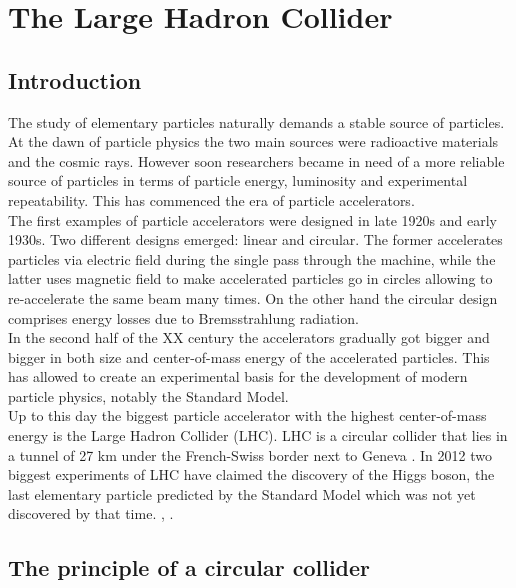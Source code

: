 \chapter{The Large Hadron Collider}
    
   
        
    \section{Introduction}
    
        The study of elementary particles naturally demands a stable source of particles. At the dawn of particle physics the two main sources were radioactive materials and the cosmic rays. However soon researchers became in need of a more reliable source of particles in terms of particle energy, luminosity and experimental repeatability. This has commenced the era of particle accelerators.\\
        The first examples of particle accelerators were designed in late 1920s and early 1930s. Two different designs emerged: linear and circular. The former accelerates particles via electric field during the single pass through the machine, while the latter uses magnetic field to make accelerated particles go in circles allowing to re-accelerate the same beam many times. On the other hand the circular design comprises energy losses due to Bremsstrahlung radiation.\\
        In the second half of the XX century the accelerators gradually got bigger and bigger in both size and center-of-mass energy of the accelerated particles. This has allowed to create an experimental basis for the development of modern particle physics, notably the Standard Model.\\
        Up to this day the biggest particle accelerator with the highest center-of-mass energy is the Large Hadron Collider (LHC). LHC is a circular collider that lies in a tunnel of 27 km under the French-Swiss border next to Geneva \cite{Bruening}. In 2012 two biggest experiments of LHC have claimed the discovery of the Higgs boson, the last elementary particle predicted by the Standard Model which was not yet discovered by that time. \cite{higgs_atlas}, \cite{higgs_cms}.
        
        \section{The principle of a circular collider}
        
